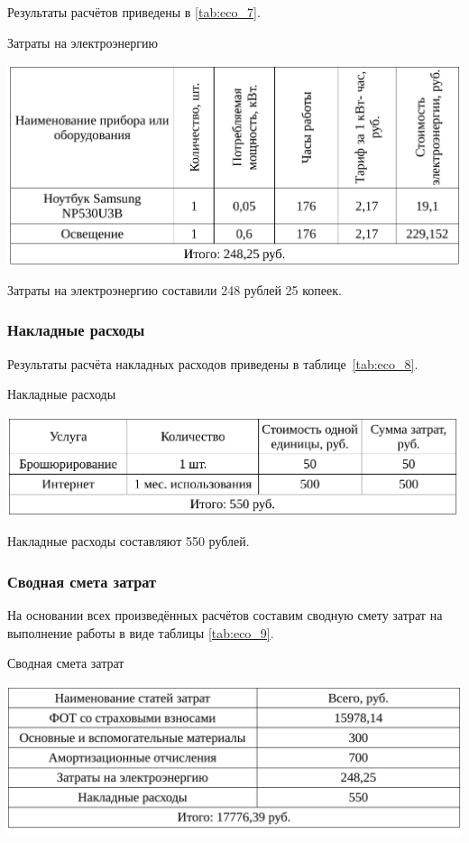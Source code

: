 Результаты расчётов приведены в \ref{tab:eco_7}.

\begin{table}[ht!]
\caption{Затраты на электроэнергию}
\centering
\includegraphics[page=1, width=1\linewidth]{tables/economics/econom_2.pdf}
\label{tab:eco_7}
\end{table}

Затраты на электроэнергию составили 248 рублей 25 копеек.


\subsubsection{Накладные расходы}

Результаты расчёта накладных расходов приведены в таблице~\ref{tab:eco_8}.

\begin{table}[ht!]
\caption{Накладные расходы}
\centering
\includegraphics[page=1, width=1\linewidth]{tables/economics/econom_3.pdf}
\label{tab:eco_8}
\end{table}

Накладные расходы составляют 550 рублей.


\subsubsection{Сводная смета затрат}

На основании всех произведённых расчётов составим сводную смету затрат на выполнение работы в виде таблицы \ref{tab:eco_9}.

\begin{table}[ht!]
\caption{Сводная смета затрат}
\centering
\includegraphics[page=1, width=1\linewidth]{tables/economics/econom_4.pdf}
\label{tab:eco_9}
\end{table}

